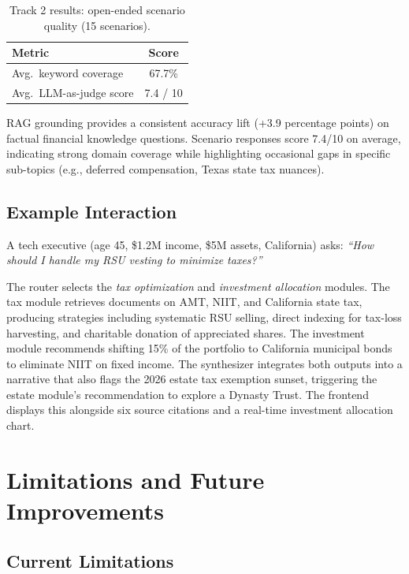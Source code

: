 \documentclass[sigplan,screen]{acmart}
\begin{document}
\begin{table}[h]
\caption{Track 2 results: open-ended scenario quality (15 scenarios).}
\label{tab:scenario}
\begin{tabular}{lc}
\toprule
Metric & Score \\
\midrule
Avg.\ keyword coverage & 67.7\% \\
Avg.\ LLM-as-judge score & 7.4 / 10 \\
\bottomrule
\end{tabular}
\end{table}

RAG grounding provides a consistent accuracy lift (+3.9 percentage points) on factual financial knowledge questions.
Scenario responses score 7.4/10 on average, indicating strong domain coverage while highlighting occasional gaps in specific sub-topics (e.g., deferred compensation, Texas state tax nuances).

\subsection{Example Interaction}

A tech executive (age 45, \$1.2M income, \$5M assets, California) asks: \emph{``How should I handle my RSU vesting to minimize taxes?''}

The router selects the \emph{tax optimization} and \emph{investment allocation} modules.
The tax module retrieves documents on AMT, NIIT, and California state tax, producing strategies including systematic RSU selling, direct indexing for tax-loss harvesting, and charitable donation of appreciated shares.
The investment module recommends shifting 15\% of the portfolio to California municipal bonds to eliminate NIIT on fixed income.
The synthesizer integrates both outputs into a narrative that also flags the 2026 estate tax exemption sunset, triggering the estate module's recommendation to explore a Dynasty Trust.
The frontend displays this alongside six source citations and a real-time investment allocation chart.

\section{Limitations and Future Improvements}

\subsection{Current Limitations}
\end{document}
